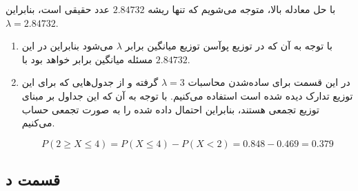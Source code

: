 \documentclass[14pt,a4]{article}
\begin{document}
با حل معادله بالا، متوجه می‌شویم که تنها ریشه $2.84732$ عدد حقیقی است، بنابراین
\linebreak
$\lambda = 2.84732$.

\begin{enumerate}[label=\alph* )]
    \item با توجه به آن که در توزیع پوآسن توزیع میانگین برابر $\lambda$ می‌شود بنابراین در این مسئله
    میانگین برابر خواهد بود با $2.84732$.
    \item در این قسمت برای ساده‌شدن محاسبات $\lambda=3$ گرفته و از جدول‌‌هایی که برای این توزیع تدارک
    دیده شده است استفاده می‌کنیم. با توجه به آن که این جداول بر مبنای توزیع تجمعی هستند، بنابراین احتمال
    داده شده را به صورت تجمعی حساب می‌کنیم.

    $$P(2 \ge X \leq 4) = P(X \leq 4) - P(X < 2) = 0.848 - 0.469 = 0.379$$
\end{enumerate}

\subsection*{قسمت د}
\end{document}
